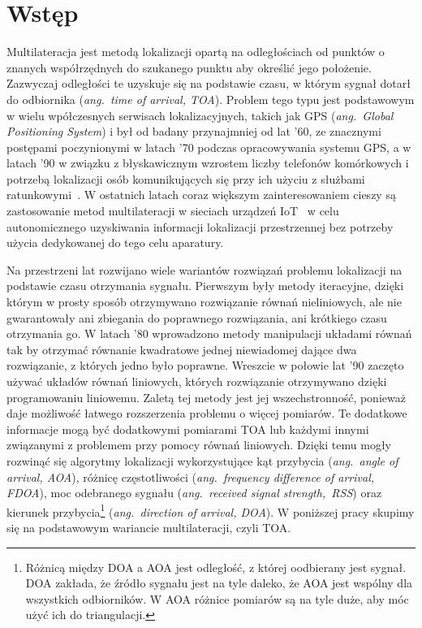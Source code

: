 \chapter*{Wstęp}\label{chap:introduction}

Multilateracja jest metodą lokalizacji opartą na odległościach od punktów o znanych współrzędnych do szukanego punktu aby określić jego położenie. Zazwyczaj odległości te uzyskuje się na podstawie czasu, w którym sygnał dotarł do odbiornika (\textit{ang.\ time of arrival, TOA}). Problem tego typu jest podstawowym w wielu wpółczesnych serwisach lokalizacyjnych, takich jak GPS (\textit{ang.\ Global Positioning System}) i był od badany przynajmniej od lat '60, ze znacznymi postępami poczynionymi w latach '70 podczas opracowywania systemu GPS, a w latach '90 w związku z błyskawicznym wzrostem liczby telefonów komórkowych i potrzebą lokalizacji osób komunikujących się przy ich użyciu z służbami ratunkowymi~\cite{govinfo}. W ostatnich latach coraz większym zainteresowaniem cieszy są zastosowanie metod multilateracji w sieciach urządzeń IoT~\cite{9184896} w celu autonomicznego uzyskiwania informacji lokalizacji przestrzennej bez potrzeby użycia dedykowanej do tego celu aparatury.

Na przestrzeni lat rozwijano wiele wariantów rozwiązań problemu lokalizacji na podstawie czasu otrzymania sygnału. Pierwszym były metody iteracyjne, dzięki którym w prosty sposób otrzymywano rozwiązanie równań nieliniowych, ale nie gwarantowały ani zbiegania do poprawnego rozwiązania, ani krótkiego czasu otrzymania go. W latach '80 wprowadzono metody manipulacji układami równań tak by otrzymać równanie kwadratowe jednej niewiadomej dające dwa rozwiązanie, z których jedno było poprawne. Wreszcie w połowie lat '90 zaczęto używać układów równań liniowych, których rozwiązanie otrzymywano dzięki programowaniu liniowemu. Zaletą tej metody jest jej wszechstronność, ponieważ daje możliwość łatwego rozszerzenia problemu o więcej pomiarów. Te dodatkowe informacje mogą być dodatkowymi  pomiarami TOA lub każdymi innymi związanymi z problemem przy pomocy równań liniowych. Dzięki temu mogły rozwinąć się algorytmy lokalizacji wykorzystujące kąt przybycia (\textit{ang.\ angle of arrival, AOA}), różnicę częstotliwości (\textit{ang.\ frequency difference of arrival, FDOA}), moc odebranego sygnału (\textit{ang.\ received signal strength,\ RSS}) oraz kierunek przybycia\footnote{Różnicą między DOA a AOA jest odległość, z której oodbierany jest sygnał. DOA zakłada, że źródło sygnału jest na tyle daleko, że AOA jest wspólny dla wszystkich odbiorników. W AOA różnice pomiarów są na tyle duże, aby móc użyć ich do triangulacji.} (\textit{ang.\ direction of arrival, DOA}). W poniższej pracy skupimy się na podstawowym wariancie multilateracji, czyli TOA.